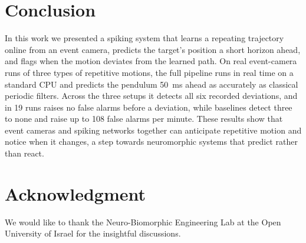 \documentclass[conference]{IEEEtran}
\begin{document}
\section{Conclusion}
\label{sec:conclusion}
In this work we presented a spiking system that learns a repeating trajectory online from an event camera, predicts the target's position a short horizon ahead, and flags when the motion deviates from the learned path. On real event-camera runs of three types of repetitive motions, the full pipeline runs in real time on a standard CPU and predicts the pendulum 50~ms ahead as accurately as classical periodic filters. Across the three setups it detects all six recorded deviations, and in 19 runs raises no false alarms before a deviation, while baselines detect three to none and raise up to 108 false alarms per minute. These results show that event cameras and spiking networks together can anticipate repetitive motion and notice when it changes, a step towards neuromorphic systems that predict rather than react.

\section*{Acknowledgment}
We would like to thank the Neuro-Biomorphic Engineering Lab at the Open University of Israel for the insightful discussions.



\end{document}
